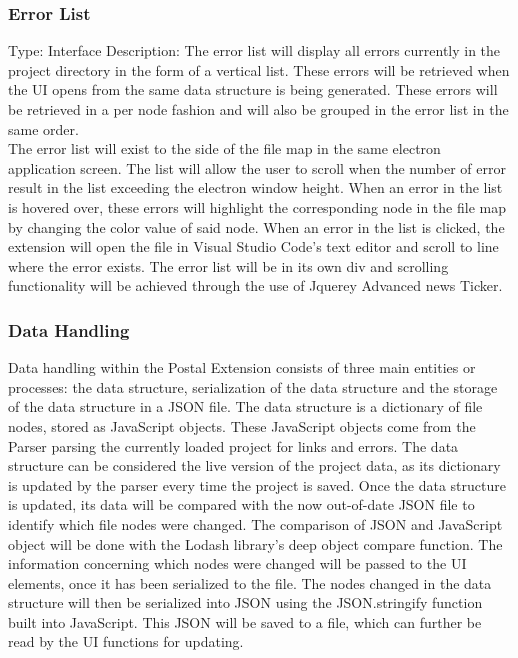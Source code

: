 \documentclass[letterpaper,10pt,titlepage,draftclsnofoot,onecolumn,onesided] {IEEEtran}
\begin{document}
	\subsubsection{Error List}
	Type: Interface
	Description: 
	The error list will display all errors currently in the project directory in the form of a vertical list. 
	These errors will be retrieved when the UI opens from the same data structure is being generated. 
	These errors will be retrieved in a per node fashion and will also be grouped in the error list in the same order. 
	\\
	The error list will exist to the side of the file map in the same electron application screen. 
	The list will allow the user to scroll when the number of error result in the list exceeding the electron window height. 
	When an error in the list is hovered over, these errors will highlight the corresponding node in the file map by changing the color value of said node. 
	When an error in the list is clicked, the extension will open the file in Visual Studio Code's text editor and scroll to line where the error exists.
	The error list will be in its own div and scrolling functionality will be achieved through the use of Jquerey Advanced news Ticker.
	
	\subsubsection{Data Handling}
	Data handling within the Postal Extension consists of three main entities or processes: the data structure, serialization of the data structure and the storage of the data structure in a JSON file.
	The data structure is a dictionary of file nodes, stored as JavaScript objects. These JavaScript objects come from the Parser parsing the currently loaded project for links and errors.
	The data structure can be considered the live version of the project data, as its dictionary is updated by the parser every time the project is saved. 
	Once the data structure is updated, its data will be compared with the now out-of-date JSON file to identify which file nodes were changed.
	The comparison of JSON and JavaScript object will be done with the Lodash library's deep object compare function.
	The information concerning which nodes were changed will be passed to the UI elements, once it has been serialized to the file.
	The nodes changed in the data structure will then be serialized into JSON using the JSON.stringify function built into JavaScript.
	This JSON will be saved to a file, which can further be read by the UI functions for updating. \cite{stringify} \cite{lodash}
	
\end{document}
